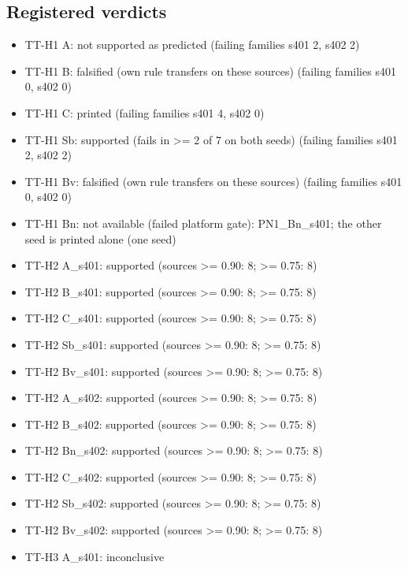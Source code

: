 \documentclass[10pt,twocolumn,letterpaper]{article}
\providecommand{\tightlist}{\setlength{\itemsep}{0pt}\setlength{\parskip}{0pt}}
\begin{document}
\subsection{Registered verdicts}\label{registered-verdicts}

\begin{itemize}
\tightlist
\item
  TT-H1 A: not supported as predicted (failing families s401 2, s402 2)
\item
  TT-H1 B: falsified (own rule transfers on these sources) (failing families s401 0, s402 0)
\item
  TT-H1 C: printed (failing families s401 4, s402 0)
\item
  TT-H1 Sb: supported (fails in \textgreater= 2 of 7 on both seeds) (failing families s401 2, s402 2)
\item
  TT-H1 Bv: falsified (own rule transfers on these sources) (failing families s401 0, s402 0)
\item
  TT-H1 Bn: not available (failed platform gate): PN1\_Bn\_s401; the other seed is printed alone (one seed)
\item
  TT-H2 A\_s401: supported (sources \textgreater= 0.90: 8; \textgreater= 0.75: 8)
\item
  TT-H2 B\_s401: supported (sources \textgreater= 0.90: 8; \textgreater= 0.75: 8)
\item
  TT-H2 C\_s401: supported (sources \textgreater= 0.90: 8; \textgreater= 0.75: 8)
\item
  TT-H2 Sb\_s401: supported (sources \textgreater= 0.90: 8; \textgreater= 0.75: 8)
\item
  TT-H2 Bv\_s401: supported (sources \textgreater= 0.90: 8; \textgreater= 0.75: 8)
\item
  TT-H2 A\_s402: supported (sources \textgreater= 0.90: 8; \textgreater= 0.75: 8)
\item
  TT-H2 B\_s402: supported (sources \textgreater= 0.90: 8; \textgreater= 0.75: 8)
\item
  TT-H2 Bn\_s402: supported (sources \textgreater= 0.90: 8; \textgreater= 0.75: 8)
\item
  TT-H2 C\_s402: supported (sources \textgreater= 0.90: 8; \textgreater= 0.75: 8)
\item
  TT-H2 Sb\_s402: supported (sources \textgreater= 0.90: 8; \textgreater= 0.75: 8)
\item
  TT-H2 Bv\_s402: supported (sources \textgreater= 0.90: 8; \textgreater= 0.75: 8)
\item
  TT-H3 A\_s401: inconclusive

\end{itemize}
\end{document}
